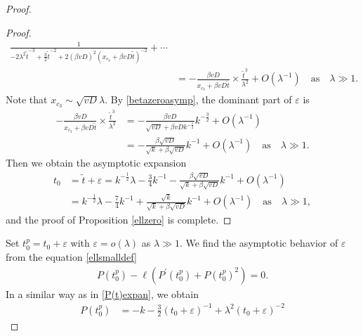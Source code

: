 \documentclass[10pt]{article}
\numberwithin{equation}{section}
\numberwithin{figure}{section}
\begin{document}
\begin{proof}
\begin{proof}
\begin{equation}
\begin{split}
\frac{1}{-2 \lambda^2 \tilde{t}^{-3} + \frac{3}{2}\tilde{t}^{-2} + 2(\beta v D)^2  \left( x_{c_3} + \beta v D \tilde{t} \right)^{-2}} + \cdots \\
 &= -\frac{\beta v D}{ x_{c_3} + \beta v D \tilde{t}} \times \frac{\tilde{t}^3}{\lambda^2} +  O\left( \lambda^{-1} \right) \quad \mbox{as} \quad \lambda \gg 1.
\end{split}
\end{equation}
Note that $x_{c_3} \sim \sqrt{vD} \lambda$. 
By \eqref{betazeroasymp}, the dominant part of $\varepsilon$ is 
\begin{equation}
\begin{split}
-\frac{\beta v D}{ x_{c_3} + \beta v D \tilde{t}} \times \frac{\tilde{t}^3}{\lambda^2}  &= -\frac{\beta v D}{ \sqrt{vD} + \beta v D k^{-\frac{1}{2}}} k^{-\frac{3}{2}} +  O\left( \lambda^{-1} \right)\\
&= -\frac{\beta\sqrt{vD}}{\sqrt{k} + \beta\sqrt{vD}}k^{-1} 
+  O\left( \lambda^{-1} \right) \quad \mbox{as} \quad \lambda \gg 1.
\end{split}
\end{equation}
Then we obtain the asymptotic expansion 
\begin{equation}\label{peaktime formula_zerolifetime}
\begin{split}
t_0 &= \tilde{t} + \varepsilon 
=  k^{-\frac{1}{2}}\lambda - \frac{3}{4}k^{-1} - \frac{\beta\sqrt{vD}}{\sqrt{k} + \beta\sqrt{vD}}k^{-1} +  O\left( \lambda^{-1} \right) \\
&=  k^{-\frac{1}{2}}\lambda - \frac{7}{4}k^{-1} + \frac{\sqrt{k}}{\sqrt{k}+\beta\sqrt{vD}}k^{-1}  +  O\left( \lambda^{-1} \right) \quad \mbox{as} \quad \lambda \gg 1,
\end{split}
\end{equation}
and the proof of Proposition \ref{ellzero} is complete.
\end{proof}
Set $t^p_0 = t_0 + \varepsilon$  with $\varepsilon = o(\lambda)$ as $\lambda \gg 1$. We find the asymptotic behavior of $\varepsilon$ from the equation \eqref{ellsmalldef}
\begin{equation}\label{tripleP}
\begin{split}
P(t^p_0) - \ell \left( P^{'}(t^p_0) + P(t^p_0)^2  \right) = 0.
\end{split}
\end{equation}
In a similar way as in \eqref{P(t)expan}, we obtain
\begin{equation}\label{P(tp)expan1}
\begin{split}
P(t^p_0) &= - k  - \frac{3}{2} \left(t_0 + \varepsilon\right)^{-1} + \lambda^2 \left(t_0 + \varepsilon\right)^{-2} 

\end{split}
\end{equation}
\end{proof}
\end{document}
